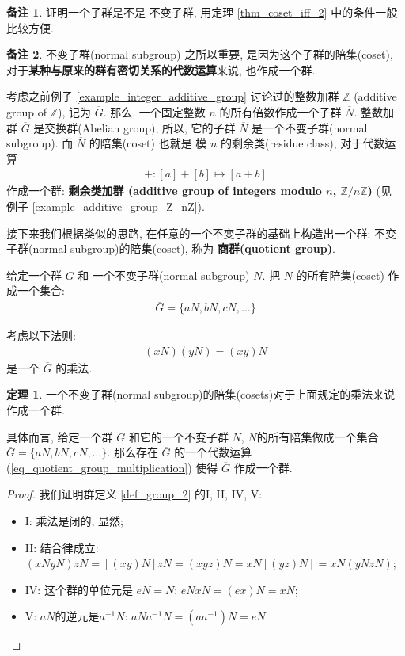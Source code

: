 \documentclass[utf8]{ctexbook}
\theoremstyle{definition}
\newtheorem{prototheorem}{定理}[section]
\newenvironment{theorem}
   {\colorlet{shadecolor}{red!30}\begin{shaded}\begin{prototheorem}}
   {\end{prototheorem}\end{shaded}}
\newtheorem{memo}{备注}[section]
\begin{document}
\begin{memo}
证明一个子群是不是 不变子群, 用定理 \ref{thm_coset_iff_2} 中的条件一般比较方便.
\end{memo}

\begin{memo}
不变子群(normal subgroup) 之所以重要, 是因为这个子群的陪集(coset), 对于\textbf{某种与原来的群有密切关系的代数运算}来说, 也作成一个群.

考虑之前例子 \ref{example_integer_additive_group} 讨论过的整数加群 $ \mathbb{ Z} $ (additive group of $\mathbb{Z}$), 记为 $\overline{G}$. 那么, 一个固定整数 $n$ 的所有倍数作成一个子群 $\overline{N}$. 整数加群 $\overline{G}$ 是交换群(Abelian group), 所以, 它的子群 $\overline{N}$ 是一个不变子群(normal subgroup). 而 $\overline{N}$ 的陪集(coset) 也就是 模 $n$ 的剩余类(residue class), 对于代数运算
\begin{align*}
+ : [a] + [b] \mapsto [a+b]
\end{align*}
作成一个群: \textbf{剩余类加群 (additive group of integers modulo $n$, $\mathbb{Z}/n \mathbb{Z}$)} (见 例子 \ref{example_additive_group_Z_nZ}).

接下来我们根据类似的思路, 在任意的一个不变子群的基础上构造出一个群: 不变子群(normal subgroup)的陪集(coset), 称为 \textbf{商群(quotient group)}.
\end{memo}

给定一个群 $G$ 和 一个不变子群(normal subgroup) $N$. 把 $N$ 的所有陪集(coset) 作成一个集合:
\begin{align*}
\overline{G} = \{ aN, bN, cN, \ldots \}
\end{align*}

考虑以下法则:
\begin{align}
(xN) (yN) = (xy) N \label{eq_quotient_group_multiplication}
\end{align}
是一个 $\overline{G}$ 的乘法.

\begin{theorem}
一个不变子群(normal subgroup)的陪集(cosets)对于上面规定的乘法来说作成一个群.

具体而言, 给定一个群 $G$ 和它的一个不变子群 $N$, $N$的所有陪集做成一个集合 $\overline{G} = \{ aN, bN, cN, \ldots \}$. 那么存在 $\overline{G}$ 的一个代数运算 (\ref{eq_quotient_group_multiplication}) 使得 $\overline{G}$ 作成一个群.

\end{theorem}

\begin{proof}
我们证明群定义 \ref{def_group_2} 的I, II, IV, V:
\begin{itemize}
\item{I: 乘法是闭的, 显然;}
\item{II: 结合律成立: $ (x N y N) z N = [ (xy) N ] z N = (xyz) N  = x N [(yz) N] = x N ( y N z N)$;}
\item{IV: 这个群的单位元是 $eN =N$: $e N x N = (ex)N = x N$;}
\item{V: $aN$的逆元是$a^{-1}N$: $a N a^{-1} N = (a a^{-1}) N = e N$.}
\end{itemize}

\end{proof}
\end{document}
